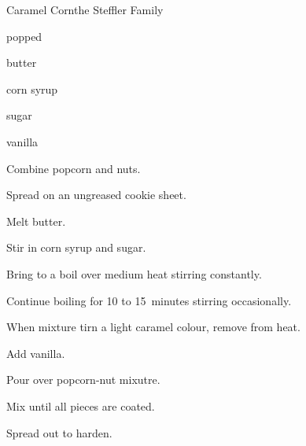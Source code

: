 \begin{recipe}{Caramel Corn}{the Steffler Family}{}

\begin{ingredients}
\item {} popped 
\item \C{\half} 
\item \C{\half} 
\item \C{\half} butter
\item \C{\quarter} corn syrup
\item \C{\twothird} sugar
\item {} vanilla
\end{ingredients}

\begin{directions}
\item Combine popcorn and nuts.
\item Spread on an ungreased cookie sheet.
\item Melt butter.
\item Stir in corn syrup and sugar.
\item Bring to a boil over medium heat stirring constantly.
\item Continue boiling for 10 to 15~minutes stirring occasionally.
\item When mixture tirn a light caramel colour, remove from heat.
\item Add vanilla.
\item Pour over popcorn-nut mixutre.
\item Mix until all pieces are coated.
\item Spread out to harden.
\end{directions}
\end{recipe}
